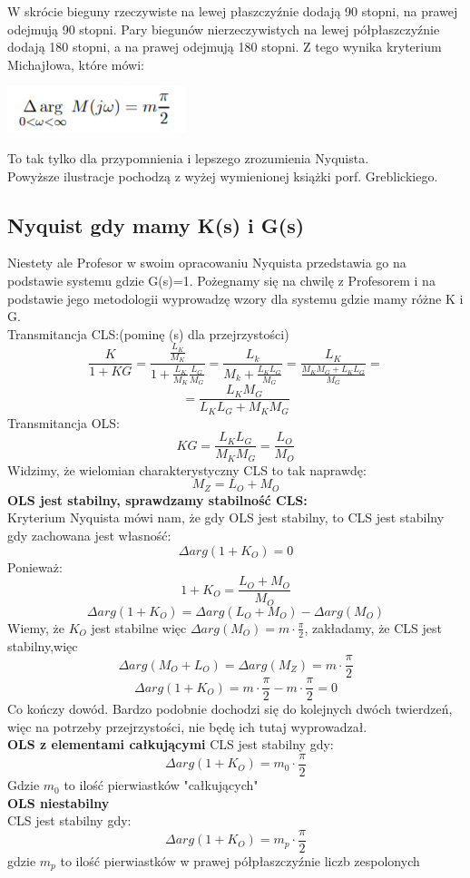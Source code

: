 \documentclass{article}
\begin{document}
W skrócie bieguny rzeczywiste na lewej płaszczyźnie dodają 90 stopni, na prawej odejmują 90 stopni. Pary biegunów nierzeczywistych na lewej półpłaszczyźnie  dodają 180 stopni, a na prawej odejmują 180 stopni. Z tego wynika kryterium Michajłowa, które mówi:
\begin{center}
    \includegraphics[]{mich5.png}
\end{center}
To tak tylko dla przypomnienia i lepszego zrozumienia Nyquista.\\
Powyższe ilustracje pochodzą z wyżej wymienionej książki porf. Greblickiego.
\subsection{Nyquist gdy mamy K(s) i G(s)}
Niestety ale Profesor w swoim opracowaniu Nyquista przedstawia go na podstawie systemu gdzie G(s)=1. Pożegnamy się na chwilę z Profesorem i na podstawie jego metodologii wyprowadzę wzory dla systemu gdzie mamy różne K i G.\\
Transmitancja CLS:(pominę (s) dla przejrzystości)\\
$$\frac{K}{1+KG}=\frac{\frac{L_K}{M_K}}{1+\frac{L_K}{M_K} \frac{L_G}{M_G}}=\frac{L_k}{M_k+\frac{L_K L_G}{M_G}}=\frac{L_K}{\frac{M_K M_G+L_K L_G}{M_G}}=$$
$$=\frac{L_K M_G}{L_K L_G + M_K M_G}$$
Transmitancja OLS:\\
$$KG=\frac{L_K L_G}{M_K M_G}=\frac{L_O}{M_O}$$
Widzimy, że wielomian charakterystyczny CLS to tak naprawdę:
$$M_Z=L_O+M_O$$
\textbf{OLS jest stabilny, sprawdzamy stabilność CLS:}\\
Kryterium Nyquista mówi nam, że gdy OLS jest stabilny, to CLS jest stabilny gdy zachowana jest własność:
$$\Delta arg(1+K_O)=0$$
Ponieważ:
$$1+K_O=\frac{L_O+M_O}{M_O}$$
$$\Delta arg(1+K_O)=\Delta arg(L_O+M_O)-\Delta arg(M_O)$$
Wiemy, że $K_O$ jest stabilne więc $\Delta arg(M_O)=m\cdot\frac{\pi}{2}$, zakładamy, że CLS jest stabilny,więc $$\Delta arg(M_O+L_O)=\Delta arg(M_Z)=m\cdot\frac{\pi}{2}$$
$$\Delta arg(1+K_O)=m\cdot\frac{\pi}{2}-m\cdot\frac{\pi}{2}=0$$
Co kończy dowód. Bardzo podobnie dochodzi się do kolejnych dwóch twierdzeń, więc na potrzeby przejrzystości, nie będę ich tutaj wyprowadzał.\\
\textbf{OLS z elementami całkującymi}
CLS jest stabilny gdy:
$$\Delta arg(1+K_O)=m_0\cdot\frac{\pi}{2}$$
Gdzie $m_0$ to ilość pierwiastków "całkujących"\\
\textbf{OLS niestabilny}\\
CLS jest stabilny gdy:
$$\Delta arg(1+K_O)=m_p\cdot\frac{\pi}{2}$$
gdzie $m_p$ to ilość pierwiastków w prawej półpłaszczyźnie liczb zespolonych\newpage
\end{document}
